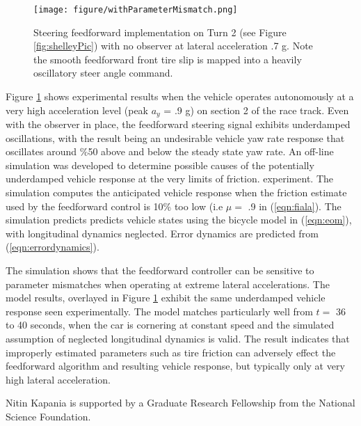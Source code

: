 \documentclass[twocolumn,10pt]{asme2e}
\begin{document}
\begin{figure}
\centering
\texttt{[image: figure/withParameterMismatch.png]}
\caption{Steering feedforward implementation on Turn 2 (see Figure \ref{fig:shelleyPic}) with no observer at lateral acceleration .7 g. Note the smooth feedforward front tire slip is mapped into a heavily oscillatory steer angle command.}
\label{fig:withParameterMismatch}
\end{figure}


Figure \ref{fig:withParameterMismatch} shows experimental results when the vehicle operates autonomously at a very high acceleration level (peak $a_y$ = .9 g) on section 2 of the race track. Even with the observer in place, the feedforward steering signal exhibits underdamped oscillations, with the result being an undesirable vehicle yaw rate response that oscillates around \%50 above and
below the steady state yaw rate. An off-line simulation was developed to determine possible causes of the potentially underdamped vehicle response at the very limits of friction.
experiment. The simulation computes the anticipated vehicle response when the friction estimate used by the feedforward control is 10\% too low (i.e $\mu = $ .9 in (\ref{eqn:fiala}). The simulation predicts
predicts vehicle states  using the bicycle model in (\ref{eqn:eom}), with longitudinal dynamics neglected. Error dynamics are predicted from (\ref{eqn:errordynamics}). 

The simulation shows that the feedforward controller can be sensitive to parameter mismatches when operating at extreme lateral accelerations. The model results, overlayed in Figure \ref{fig:withParameterMismatch} exhibit the same underdamped vehicle response seen experimentally. The model matches
particularly well from $t =$ 36 to 40 seconds, when the car is cornering at constant speed and the simulated assumption of neglected longitudinal dynamics is valid. The result indicates that improperly estimated parameters such as tire friction can adversely effect the feedforward algorithm and resulting vehicle response, but typically
only at very high lateral acceleration.





\begin{acknowledgment}
Nitin Kapania is supported by a Graduate Research Fellowship from the National Science Foundation.
\end{acknowledgment}
\end{document}
